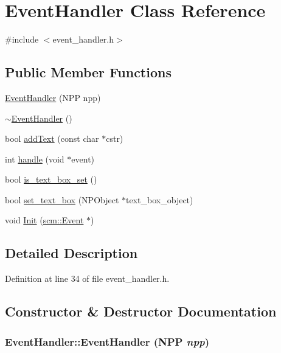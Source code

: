 \hypertarget{class_event_handler}{
\section{EventHandler Class Reference}
\label{class_event_handler}
}


{\ttfamily \#include $<$event\_\-handler.h$>$}

\subsection*{Public Member Functions}
\begin{DoxyCompactItemize}
\item 
\hyperlink{class_event_handler_a6b7f9af8b5c3c4128047d35467ca0da0}{EventHandler} (NPP npp)
\item 
\hyperlink{class_event_handler_a3decb8cd88ba8af2b9b0b0f0f2fcd722}{$\sim$EventHandler} ()
\item 
bool \hyperlink{class_event_handler_a18771c6be120edf9d912a4003066b8b3}{addText} (const char $\ast$cstr)
\item 
int \hyperlink{class_event_handler_a2fcafd6f528017d8a814f9c384e2e057}{handle} (void $\ast$event)
\item 
bool \hyperlink{class_event_handler_a2f334e3eb39be72751e342619489e695}{is\_\-text\_\-box\_\-set} ()
\item 
bool \hyperlink{class_event_handler_aa09c0b995aa6c774d4a33be13be0cbf2}{set\_\-text\_\-box} (NPObject $\ast$text\_\-box\_\-object)
\item 
void \hyperlink{class_event_handler_a67d149352861c0a8fe603a14585d1003}{Init} (\hyperlink{classscm_1_1_event}{scm::Event} $\ast$)
\end{DoxyCompactItemize}


\subsection{Detailed Description}


Definition at line 34 of file event\_\-handler.h.



\subsection{Constructor \& Destructor Documentation}
\hypertarget{class_event_handler_a6b7f9af8b5c3c4128047d35467ca0da0}{
\subsubsection[{EventHandler}]{\setlength{\rightskip}{0pt plus 5cm}EventHandler::EventHandler (NPP {\em npp})}}
\label{class_event_handler_a6b7f9af8b5c3c4128047d35467ca0da0}


